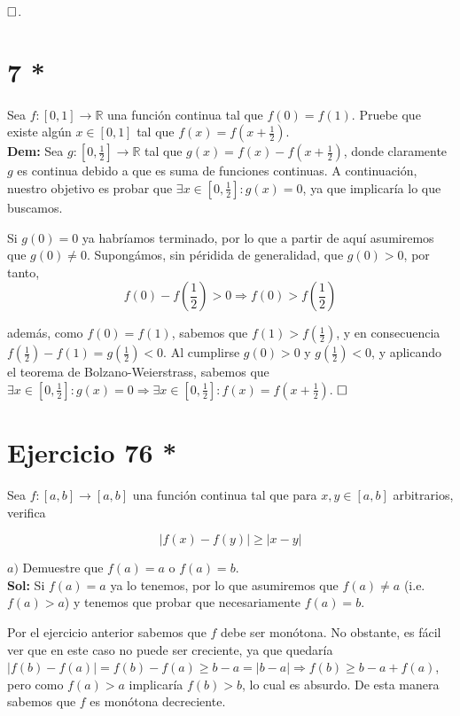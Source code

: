 \documentclass{article}
\begin{document}
$\hfill\square$.

\section{7 *}

Sea $f : [0, 1] \longrightarrow \mathbb{R}$ una función continua tal que $f(0) = f(1)$. Pruebe que existe algún $x \in [0, 1]$ tal que $f(x) = f(x + \frac{1}{2})$. \\

\textbf{Dem:} Sea $g : [0, \frac{1}{2}] \longrightarrow \mathbb{R}$ tal que $g(x) = f(x) - f(x + \frac{1}{2})$, donde claramente $g$ es continua debido a que es suma de funciones continuas. A continuación, nuestro objetivo es probar que $\exists x \in [0, \frac{1}{2}]: g(x) = 0$, ya que implicaría lo que buscamos.

Si $g(0) = 0$ ya habríamos terminado, por lo que a partir de aquí asumiremos que $g(0) \neq 0$. Supongámos, sin péridida de generalidad, que $g(0) > 0$, por tanto,  \[f(0) - f(\frac{1}{2}) > 0 \Longrightarrow f(0) > f(\frac{1}{2})\]

además, como $f(0) = f(1)$, sabemos que $f(1) > f(\frac{1}{2})$, y en consecuencia $f(\frac{1}{2}) - f(1) = g(\frac{1}{2}) < 0$. Al cumplirse $g(0) > 0$ y $g(\frac{1}{2}) < 0$, y aplicando el teorema de Bolzano-Weierstrass, sabemos que $\exists x \in [0, \frac{1}{2}]: g(x) = 0 \Longrightarrow \exists x \in [0, \frac{1}{2}]: f(x) = f(x + \frac{1}{2})$. $\hfill\square$

\newpage

\section{Ejercicio 76 *}

Sea $f : [a, b] \longrightarrow [a, b]$ una función continua tal que para $x, y \in [a, b]$ arbitrarios, verifica

\[|f(x) - f(y)| \geq |x - y|\]

$a)$ Demuestre que $f(a) = a$ o $f(a) = b$. \\

\noindent \textbf{Sol:} Si $f(a) = a$ ya lo tenemos, por lo que asumiremos que $f(a) \neq a$ (i.e. $f(a) > a$) y tenemos que probar que necesariamente $f(a) = b$.

Por el ejercicio anterior sabemos que $f$ debe ser monótona. No obstante, es fácil ver que en este caso no puede ser creciente, ya que quedaría $|f(b) - f(a)| = f(b) - f(a) \geq b - a = |b - a| \Longrightarrow f(b) \geq b - a + f(a)$, pero como $f(a) > a$ implicaría $f(b) > b$, lo cual es absurdo. De esta manera sabemos que $f$ es monótona decreciente.
\end{document}
